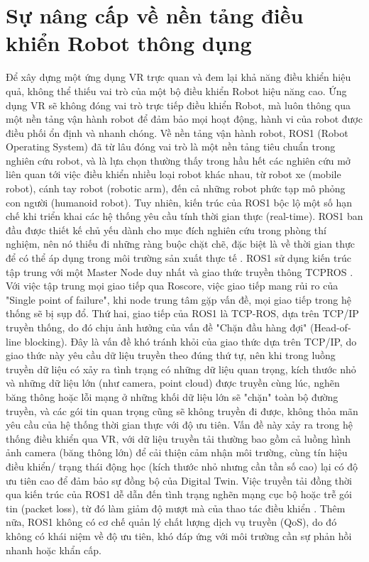 \section{Sự nâng cấp về nền tảng điều khiển Robot thông dụng}

Để xây dựng một ứng dụng VR trực quan và đem lại khả năng điều khiển hiệu quả, không thể thiếu vai trò của một bộ điều khiển Robot hiệu năng cao. Ứng dụng VR sẽ không đóng vai trò trực tiếp điều khiển Robot, mà luôn thông qua một nền tảng vận hành robot để đảm bảo mọi hoạt động, hành vi của robot được điều phối ổn định và nhanh chóng. Về nền tảng vận hành robot, ROS1 (Robot Operating System) đã từ lâu đóng vai trò là một nền tảng tiêu chuẩn trong nghiên cứu robot, và là lựa chọn thường thấy trong hầu hết các nghiên cứu mở liên quan tới việc điều khiển nhiều loại robot khác nhau, từ robot xe (mobile robot), cánh tay robot (robotic arm), đến cả những robot phức tạp mô phỏng con người (humanoid robot). Tuy nhiên, kiến trúc của ROS1 bộc lộ một số hạn chế khi triển khai các hệ thống yêu cầu tính thời gian thực (real-time). ROS1 ban đầu được thiết kế chủ yếu dành cho mục đích nghiên cứu trong phòng thí nghiệm, nên nó thiếu đi những ràng buộc chặt chẽ, đặc biệt là về thời gian thực để có thể áp dụng trong môi trường sản xuất thực tế \cite{macenski2022robot}. ROS1 sử dụng kiến trúc tập trung với một Master Node duy nhất và giao thức truyền thông TCPROS \cite{macenski2022robot}. Với việc tập trung mọi giao tiếp qua Roscore, việc giao tiếp mang rủi ro của "Single point of failure", khi node trung tâm gặp vấn đề, mọi giao tiếp trong hệ thống sẽ bị sụp đổ. Thứ hai, giao tiếp của ROS1 là TCP-ROS, dựa trên TCP/IP truyền thống, do đó chịu ảnh hưởng của vấn đề "Chặn đầu hàng đợi" (Head-of-line blocking). Đây là vấn đề khó tránh khỏi của giao thức dựa trên TCP/IP, do giao thức này yêu cầu dữ liệu truyền theo đúng thứ tự, nên khi trong luồng truyền dữ liệu có xảy ra tình trạng có những dữ liệu quan trọng, kích thước nhỏ và những dữ liệu lớn (như camera, point cloud) được truyền cùng lúc, nghẽn băng thông hoặc lỗi mạng ở những khối dữ liệu lớn sẽ "chặn" toàn bộ đường truyền, và các gói tin quan trọng cũng sẽ không truyền đi được, không thỏa mãn yêu cầu của hệ thống thời gian thực với độ ưu tiên. Vấn đề này xảy ra trong hệ thống điều khiển qua VR, với dữ liệu truyền tải thường bao gồm cả luồng hình ảnh camera (băng thông lớn) để cải thiện cảm nhận môi trường, cùng tín hiệu điều khiển/ trạng thái động học (kích thước nhỏ nhưng cần tần số cao) lại có độ ưu tiên cao để đảm bảo sự đồng bộ của Digital Twin. Việc truyền tải đồng thời qua kiến trúc của ROS1 dễ dẫn đến tình trạng nghẽn mạng cục bộ hoặc trễ gói tin (packet loss), từ đó làm giảm độ mượt mà của thao tác điều khiển \cite{kawshan2026digital, casini2025survey}. Thêm nữa, ROS1 không có cơ chế quản lý chất lượng dịch vụ truyền (QoS), do đó không có khái niệm về độ ưu tiên, khó đáp ứng với môi trường cần sự phản hồi nhanh hoặc khẩn cấp.

